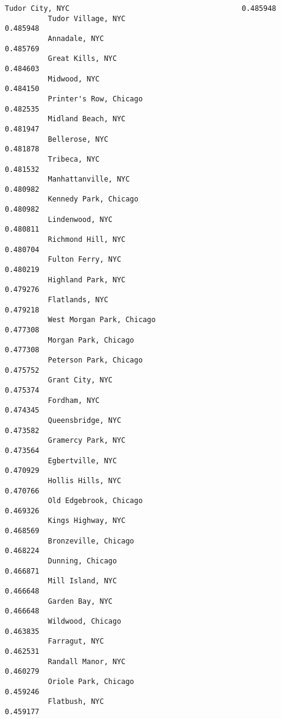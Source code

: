 \documentclass[11pt]{article}
\begin{document}
\begin{Verbatim}[commandchars=\\\{\}]
          Tudor City, NYC                                        0.485948
          Tudor Village, NYC                                     0.485948
          Annadale, NYC                                          0.485769
          Great Kills, NYC                                       0.484603
          Midwood, NYC                                           0.484150
          Printer's Row, Chicago                                 0.482535
          Midland Beach, NYC                                     0.481947
          Bellerose, NYC                                         0.481878
          Tribeca, NYC                                           0.481532
          Manhattanville, NYC                                    0.480982
          Kennedy Park, Chicago                                  0.480982
          Lindenwood, NYC                                        0.480811
          Richmond Hill, NYC                                     0.480704
          Fulton Ferry, NYC                                      0.480219
          Highland Park, NYC                                     0.479276
          Flatlands, NYC                                         0.479218
          West Morgan Park, Chicago                              0.477308
          Morgan Park, Chicago                                   0.477308
          Peterson Park, Chicago                                 0.475752
          Grant City, NYC                                        0.475374
          Fordham, NYC                                           0.474345
          Queensbridge, NYC                                      0.473582
          Gramercy Park, NYC                                     0.473564
          Egbertville, NYC                                       0.470929
          Hollis Hills, NYC                                      0.470766
          Old Edgebrook, Chicago                                 0.469326
          Kings Highway, NYC                                     0.468569
          Bronzeville, Chicago                                   0.468224
          Dunning, Chicago                                       0.466871
          Mill Island, NYC                                       0.466648
          Garden Bay, NYC                                        0.466648
          Wildwood, Chicago                                      0.463835
          Farragut, NYC                                          0.462531
          Randall Manor, NYC                                     0.460279
          Oriole Park, Chicago                                   0.459246
          Flatbush, NYC                                          0.459177

\end{Verbatim}
\end{document}
